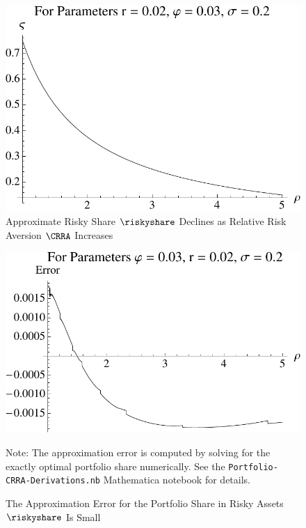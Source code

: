 \pagebreak\vfill\eject
\begin{figure}[h]
  \centering
  \caption{Approximate Risky Share $\riskyshare$ Declines as Relative Risk Aversion $\CRRA$ Increases}
    \label{fig:Port:a}
    \includegraphics[width=6in]{./Figures/ShareVsCRRA}
  \end{figure}
  \begin{figure}
    \centering
    \caption{The Approximation Error for the Portfolio Share in Risky Assets $\riskyshare$ Is Small}
    \label{fig:Port:b}
    \includegraphics[width=6in]{./Figures/ShareApproxErr}
\begin{flushleft} \footnotesize Note: The approximation error is computed by solving for the exactly optimal
  portfolio share numerically.  See the \texttt{Portfolio-CRRA-Derivations.nb} Mathematica notebook for details.
  \end{flushleft}
\end{figure}

